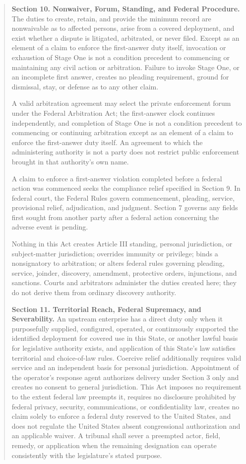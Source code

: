\begin{quote}
\textbf{Section 10. Nonwaiver, Forum, Standing, and Federal Procedure.} The duties to create, retain, and provide the minimum record are nonwaivable as to affected persons, arise from a covered deployment, and exist whether a dispute is litigated, arbitrated, or never filed. Except as an element of a claim to enforce the first-answer duty itself, invocation or exhaustion of Stage One is not a condition precedent to commencing or maintaining any civil action or arbitration. Failure to invoke Stage One, or an incomplete first answer, creates no pleading requirement, ground for dismissal, stay, or defense as to any other claim.

A valid arbitration agreement may select the private enforcement forum under the Federal Arbitration Act; the first-answer clock continues independently, and completion of Stage One is not a condition precedent to commencing or continuing arbitration except as an element of a claim to enforce the first-answer duty itself. An agreement to which the administering authority is not a party does not restrict public enforcement brought in that authority's own name.

A claim to enforce a first-answer violation completed before a federal action was commenced seeks the compliance relief specified in Section 9. In federal court, the Federal Rules govern commencement, pleading, service, provisional relief, adjudication, and judgment. Section 7 governs any fields first sought from another party after a federal action concerning the adverse event is pending.

Nothing in this Act creates Article III standing, personal jurisdiction, or subject-matter jurisdiction; overrides immunity or privilege; binds a nonsignatory to arbitration; or alters federal rules governing pleading, service, joinder, discovery, amendment, protective orders, injunctions, and sanctions. Courts and arbitrators administer the duties created here; they do not derive them from ordinary discovery authority.

\textbf{Section 11. Territorial Reach, Federal Supremacy, and Severability.} An upstream enterprise has a direct duty only when it purposefully supplied, configured, operated, or continuously supported the identified deployment for covered use in this State, or another lawful basis for legislative authority exists, and application of this State's law satisfies territorial and choice-of-law rules. Coercive relief additionally requires valid service and an independent basis for personal jurisdiction. Appointment of the operator's response agent authorizes delivery under Section 3 only and creates no consent to general jurisdiction. This Act imposes no requirement to the extent federal law preempts it, requires no disclosure prohibited by federal privacy, security, communications, or confidentiality law, creates no claim solely to enforce a federal duty reserved to the United States, and does not regulate the United States absent congressional authorization and an applicable waiver. A tribunal shall sever a preempted actor, field, remedy, or application when the remaining designation can operate consistently with the legislature's stated purpose.


\end{quote}
